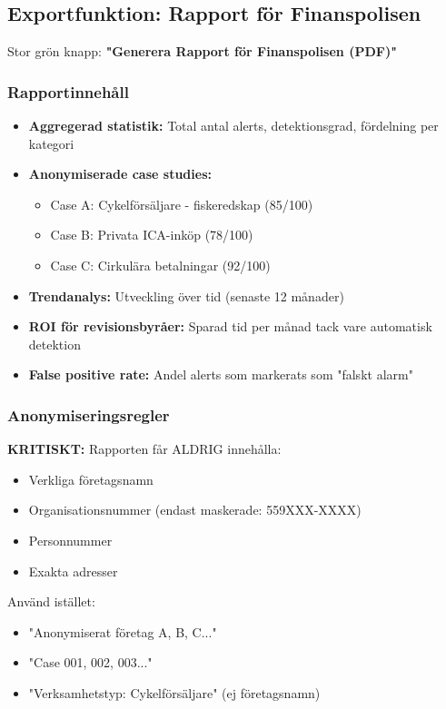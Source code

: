 \documentclass[12pt,a4paper]{article}
\begin{document}
\subsection{Exportfunktion: Rapport för Finanspolisen}
Stor grön knapp: \textbf{"Generera Rapport för Finanspolisen (PDF)"}

\subsubsection{Rapportinnehåll}
\begin{itemize}
  \item \textbf{Aggregerad statistik:} Total antal alerts, detektionsgrad, fördelning per kategori
  \item \textbf{Anonymiserade case studies:} 
  \begin{itemize}
    \item Case A: Cykelförsäljare - fiskeredskap (85/100)
    \item Case B: Privata ICA-inköp (78/100)
    \item Case C: Cirkulära betalningar (92/100)
  \end{itemize}
  \item \textbf{Trendanalys:} Utveckling över tid (senaste 12 månader)
  \item \textbf{ROI för revisionsbyråer:} Sparad tid per månad tack vare automatisk detektion
  \item \textbf{False positive rate:} Andel alerts som markerats som "falskt alarm"
\end{itemize}

\subsubsection{Anonymiseringsregler}
\textbf{KRITISKT:} Rapporten får ALDRIG innehålla:
\begin{itemize}
  \item Verkliga företagsnamn
  \item Organisationsnummer (endast maskerade: 559XXX-XXXX)
  \item Personnummer
  \item Exakta adresser
\end{itemize}

Använd istället:
\begin{itemize}
  \item "Anonymiserat företag A, B, C..."
  \item "Case 001, 002, 003..."
  \item "Verksamhetstyp: Cykelförsäljare" (ej företagsnamn)
\end{itemize}
\end{document}
